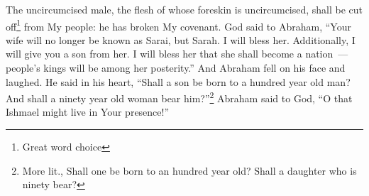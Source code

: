 \begin{enumerate}[align=center]
     The uncircumcised male, the flesh of whose foreskin is uncircumcised, shall be cut off\footnote{Great word choice} from My people: he has broken My covenant.%
     God said to Abraham, ``Your wife will no longer be known as Sarai, but Sarah.%
     I will bless her. Additionally, I will give you a son from her. I will bless her that she shall become a nation~--- people's kings will be among her posterity.''%
     And Abraham fell on his face and laughed. He said in his heart, ``Shall a son be born to a hundred year old man? And shall a ninety year old woman bear him?''\footnote{More lit., Shall one be born to an hundred year old? Shall a daughter who is ninety bear?}%
     Abraham said to God, ``O that Ishmael might live in Your presence!''%
\end{enumerate}
